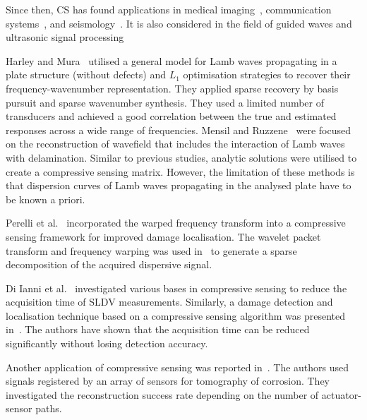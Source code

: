 Since then, CS has found applications in medical imaging~\cite{Lustig2007}, communication systems~\cite{Gao2018}, and seismology~\cite{Herrmann2012}.
It is also considered in the field of guided waves and ultrasonic signal processing~\cite{Harley2013,Mesnil2016,Perelli2012,Perelli2015,DiIanni2015,KeshmiriEsfandabadi2018,Chang2020}

Harley and Mura~\cite{Harley2013} utilised a general model for Lamb waves propagating in a plate structure (without defects) and $L_1$ optimisation strategies to recover their frequency-wavenumber representation. 
They applied sparse recovery by basis pursuit and sparse wavenumber synthesis.
They used a limited number of transducers and achieved a good correlation between the true and estimated responses across a wide range of frequencies.
Mensil and Ruzzene~\cite{Mesnil2016} were focused on the reconstruction of wavefield that includes the interaction of Lamb waves with delamination.
Similar to previous studies, analytic solutions were utilised to create a compressive sensing matrix.
However, the limitation of these methods is that dispersion curves of Lamb waves propagating in the analysed plate have to be known a priori.

Perelli et al.~\cite{Perelli2012} incorporated the warped frequency transform into a compressive sensing framework for improved damage localisation.
The wavelet packet transform and frequency warping was used in~\cite{Perelli2015} to generate a sparse decomposition of the acquired dispersive signal.

Di Ianni et al.~\cite{DiIanni2015} investigated various bases in compressive sensing to reduce the acquisition time of SLDV measurements.
Similarly, a damage detection and localisation technique based on a compressive sensing algorithm was presented in~\cite{KeshmiriEsfandabadi2018}.
The authors have shown that the acquisition time can be reduced significantly without losing detection accuracy.

Another application of compressive sensing was reported in~\cite{Chang2020}. 
The authors used signals registered by an array of sensors for tomography of corrosion.
They investigated the reconstruction success rate depending on the number of actuator-sensor paths.

